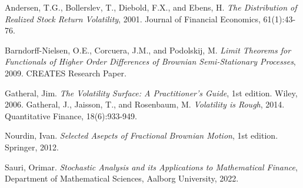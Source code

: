 \documentclass[11pt,a4paper,twoside,openright,english]{book}
\begin{document}
\frontmatter





\mainmatter

%









% 
% 

%

\backmatter


%
%
\begin{thebibliography}{}
Andersen, T.G., Bollerslev, T., Diebold, F.X., and Ebens, H. \textit{The Distribution of Realized Stock Return Volatility}, 2001. Journal of Financial Economics, 61(1):43-76.

Barndorff-Nielsen, O.E., Corcuera, J.M., and Podolskij, M. \textit{Limit Theorems for Functionals of Higher Order Differences of Brownian Semi-Stationary Processes}, 2009. CREATES Research Paper.

Gatheral, Jim. \textit{The Volatility Surface: A Practitioner's Guide}, 1st edition. Wiley, 2006.
Gatheral, J., Jaisson, T., and Rosenbaum, M. \textit{Volatility is Rough}, 2014. Quantitative Finance, 18(6):933-949.

Nourdin, Ivan. \textit{Selected Asepcts of Fractional Brownian Motion}, 1st edition. Springer, 2012.

Sauri, Orimar. \textit{Stochastic Analysis and its Applications to Mathematical Finance}, Department of Mathematical Sciences, Aalborg University, 2022.
\end{thebibliography}{}
\end{document}
